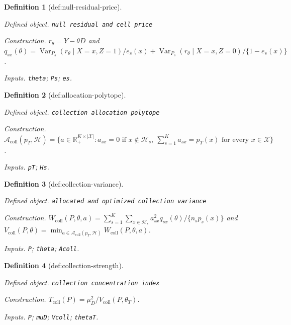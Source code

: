 \documentclass{article}
\newtheorem{definition}{Definition}
\begin{document}
\begin{definition}[def:null-residual-price]\label{def:null-residual-price}
\par\smallskip\noindent\emph{Defined object.} \texttt{null residual and cell price}
\par\smallskip\noindent\emph{Construction.} \(r_\theta=Y-\theta D\) and \(q_{sx}(\theta)=\operatorname{Var}_{P_s}(r_\theta\mid X=x,Z=1)/e_s(x)+\operatorname{Var}_{P_s}(r_\theta\mid X=x,Z=0)/\{1-e_s(x)\}\).
\par\smallskip\noindent\emph{Inputs.} \texttt{theta}; \texttt{Ps}; \texttt{es}.
\end{definition}

\begin{definition}[def:allocation-polytope]\label{def:allocation-polytope}
\par\smallskip\noindent\emph{Defined object.} \texttt{collection allocation polytope}
\par\smallskip\noindent\emph{Construction.} \(\mathcal A_{\mathrm{coll}}(p_T,\mathcal H)=\{a\in\mathbb R_+^{K\times|\mathcal X|}:a_{sx}=0\text{ if }x\notin\mathcal H_s,\ \sum_{s=1}^K a_{sx}=p_T(x)\text{ for every }x\in\mathcal X\}\).
\par\smallskip\noindent\emph{Inputs.} \texttt{pT}; \texttt{Hs}.
\end{definition}

\begin{definition}[def:collection-variance]\label{def:collection-variance}
\par\smallskip\noindent\emph{Defined object.} \texttt{allocated and optimized collection variance}
\par\smallskip\noindent\emph{Construction.} \(W_{\mathrm{coll}}(P,\theta,a)=\sum_{s=1}^K\sum_{x\in\mathcal H_s}a_{sx}^2q_{sx}(\theta)/\{n_sp_s(x)\}\) and \(V_{\mathrm{coll}}(P,\theta)=\min_{a\in\mathcal A_{\mathrm{coll}}(p_T,\mathcal H)}W_{\mathrm{coll}}(P,\theta,a)\).
\par\smallskip\noindent\emph{Inputs.} \texttt{P}; \texttt{theta}; \texttt{Acoll}.
\end{definition}

\begin{definition}[def:collection-strength]\label{def:collection-strength}
\par\smallskip\noindent\emph{Defined object.} \texttt{collection concentration index}
\par\smallskip\noindent\emph{Construction.} \(T_{\mathrm{coll}}(P)=\mu_D^2/V_{\mathrm{coll}}(P,\theta_T)\).
\par\smallskip\noindent\emph{Inputs.} \texttt{P}; \texttt{muD}; \texttt{Vcoll}; \texttt{thetaT}.
\end{definition}
\end{document}
